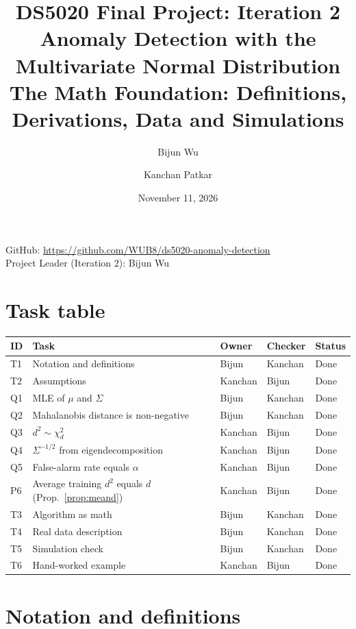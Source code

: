 \documentclass[11pt]{article}
\title{DS5020 Final Project: Iteration 2\\[4pt]
\large Anomaly Detection with the Multivariate Normal Distribution\\
The Math Foundation: Definitions, Derivations, Data and Simulations}
\author{Bijun Wu \and Kanchan Patkar}
\date{November 11, 2026}
\theoremstyle{definition}
\begin{document}
\maketitle

\begin{center}
GitHub: \url{https://github.com/WUB8/ds5020-anomaly-detection}\\[2pt]
Project Leader (Iteration 2): Bijun Wu
\end{center}

\section{Task table}
\begin{center}
\begin{tabular}{@{}lllll@{}}
\toprule
ID & Task & Owner & Checker & Status \\
\midrule
T1 & Notation and definitions & Bijun & Kanchan & Done \\
T2 & Assumptions & Kanchan & Bijun & Done \\
Q1 & MLE of $\mu$ and $\Sigma$ & Bijun & Kanchan & Done \\
Q2 & Mahalanobis distance is non-negative & Bijun & Kanchan & Done \\
Q3 & $d^2\sim\chi^2_d$ & Kanchan & Bijun & Done \\
Q4 & $\Sigma^{-1/2}$ from eigendecomposition & Kanchan & Bijun & Done \\
Q5 & False-alarm rate equals $\alpha$ & Kanchan & Bijun & Done \\
P6 & Average training $d^2$ equals $d$ (Prop.~\ref{prop:meand}) & Kanchan & Bijun & Done \\
T3 & Algorithm as math & Bijun & Kanchan & Done \\
T4 & Real data description & Bijun & Kanchan & Done \\
T5 & Simulation check & Bijun & Kanchan & Done \\
T6 & Hand-worked example & Kanchan & Bijun & Done \\
\bottomrule
\end{tabular}
\end{center}

\section{Notation and definitions}
\end{document}
